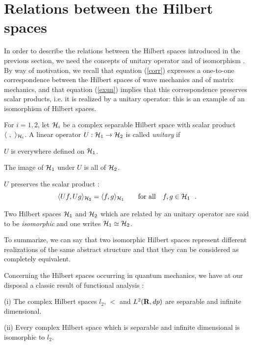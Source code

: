 \documentclass[12pt]{report}
\begin{document}
 
 
\section{Relations between the Hilbert spaces}
 
 In order to describe the relations between the Hilbert spaces
 introduced in the previous section, we need 
 the concepts of unitary operator and of isomorphism \cite{rs}.
By way of motivation, we recall 
that equation (\ref{corr}) expresses a one-to-one correspondence 
between the Hilbert spaces of wave mechanics and of matrix mechanics, 
and that equation (\ref{exun}) implies that 
this correspondence preserves scalar products,
i.e. it is realized by a unitary operator:
this is an example of an 
isomorphism of Hilbert spaces.

\begin{defin}
For $i=1,2$, let ${\cal H}_i$  be a complex separable Hilbert space with
scalar product  $\langle \ , \ \rangle _{{\cal H}_i}$. 
A linear operator
$U : {\cal H}_1 \to {\cal H}_2$ is called  {\em unitary}
if
 
 $U$ is everywhere defined on ${\cal H}_1$.
 
 The image of ${\cal H}_1$ under $U$ is all of 
${\cal H}_2$.
 
 $U$ preserves the scalar product :
\begin{equation}
\label{un}
\langle U f , U g \rangle _{{\cal H}_2} = \langle f , g \rangle _{{\cal H}_1}
\qquad \mbox{for  all} \quad f,g \in {\cal H}_1
\ \ .
\end{equation}
 
Two Hilbert spaces ${\cal H}_1$ and  ${\cal H}_2$ which are related by 
 an unitary operator are said to be {\em isomorphic} and one writes 
${\cal H}_1 \simeq {\cal H}_2$.
\end{defin}
	
To summarize, we can say that two isomorphic Hilbert spaces 
represent different realizations of the same abstract 
structure and that they can be considered as completely equivalent. 

Concerning the Hilbert spaces occurring in quantum mechanics,
we have at our disposal a  classic result of functional analysis : 

\begin{theo}
{\rm (i)} The complex Hilbert spaces $l_2, \,  \lt$ and  ${L^2 ({{\bf R}},dp)}$
are separable and infinite dimensional. 
 
\noindent
{\rm (ii)} Every complex Hilbert space which is separable and infinite
dimensional is isomorphic to $l_2$.
\end{theo}
\end{document}
